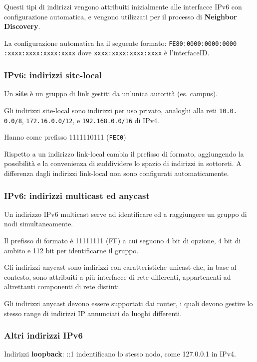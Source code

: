             Questi tipi di indirizzi vengono attribuiti inizialmente alle interfacce IPv6 con configurazione automatica, e vengono utilizzati per il processo di \textbf{Neighbor Discovery}.
        
            La configurazione automatica ha il seguente formato: \verb-FE80:0000:0000:0000- \verb-:xxxx:xxxx:xxxx:xxxx- dove \verb-xxxx:xxxx:xxxx:xxxx- è l'interfaceID.

        \subsubsection{IPv6: indirizzi site-local}
            Un \textbf{site} è un gruppo di link gestiti da un'unica autorità (es. campus).
        
            Gli indirizzi site-local sono indirizzi per uso privato, analoghi alla reti \verb:10.0.: \verb:0.0/8:, \verb:172.16.0.0/12:, e \verb:192.168.0.0/16: di IPv4.
        
            Hanno come prefisso 1111110111 (\verb:FEC0:)

            Rispetto a un indirizzo link-local cambia il prefisso di formato, aggiungendo la possibilità e la convenienza di suddividere lo spazio di indirizzi in sottoreti. A differenza dagli indirizzi link-local non sono configurati automaticamente.

        \subsubsection{IPv6: indirizzi multicast ed anycast}
            Un indirizzo IPv6 multicast serve ad identificare ed a raggiungere un gruppo di nodi simultaneamente.
        
            Il prefisso di formato è 11111111 (FF) a cui seguono 4 bit di opzione, 4 bit di ambito e 112 bit per identificarne il gruppo.
        
            Gli indirizzi anycast sono indirizzi con caratteristiche unicast che, in base al contesto, sono attribuiti a più interfacce di rete differenti, appartenenti ad altrettanti componenti di rete distinti.
        
            Gli indirizzi anycast devono essere supportati dai router, i quali devono gestire lo stesso range di indirizzi IP annunciati da luoghi differenti.

        \subsubsection{Altri indirizzi IPv6}
            Indirizzi \textbf{loopback}: ::1 indentificano lo stesso nodo, come 127.0.0.1 in IPv4.
        
